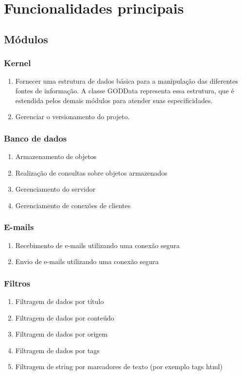 \section{Funcionalidades principais}

\subsection{Módulos}

\subsubsection{Kernel}
\begin{enumerate}
\item Fornecer uma estrutura de dados básica para a manipulação das diferentes fontes de informação. A classe GODData representa essa estrutura, que é estendida pelos demais módulos para atender suas especificidades.
\item Gerenciar o versionamento do projeto.
\end{enumerate}

\subsubsection{Banco de dados}
\begin{enumerate}
\item Armazenamento de objetos
\item Realização de consultas sobre objetos armazenados
\item Gerenciamento do servidor
\item Gerenciamento de conexões de clientes
\end{enumerate}

\subsubsection{E-mails}
\begin{enumerate}
\item Recebimento de e-mails utilizando uma conexão segura
\item Envio de e-mails utilizando uma conexão segura
\end{enumerate}

\subsubsection{Filtros}
\begin{enumerate}
\item Filtragem de dados por título
\item Filtragem de dados por conteúdo
\item Filtragem de dados por origem
\item Filtragem de dados por tags
\item Filtragem de string por marcadores de texto (por exemplo tags html)
\end{enumerate}

